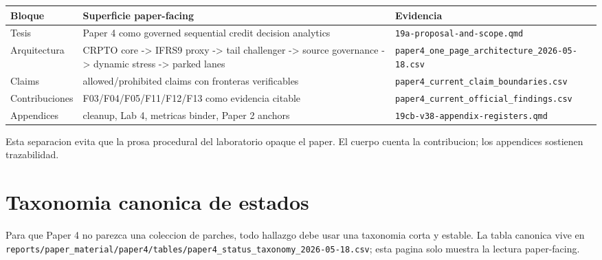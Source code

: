 \documentclass[
  spanish,
  11pt,
  letterpaper,
]{scrbook}
\newcounter{none} %
\theoremstyle{plain}
\theoremstyle{remark}
\begin{document}
{\def\LTcaptype{none} %
\begin{longtable}[]{@{}
  >{\raggedright\arraybackslash}p{}
  >{\raggedright\arraybackslash}p{}
  >{\raggedright\arraybackslash}p{}@{}}
\toprule\noalign{}
\begin{minipage}[b]{\linewidth}\raggedright
Bloque
\end{minipage} & \begin{minipage}[b]{\linewidth}\raggedright
Superficie paper-facing
\end{minipage} & \begin{minipage}[b]{\linewidth}\raggedright
Evidencia
\end{minipage} \\
\midrule\noalign{}
\endhead
\bottomrule\noalign{}
\endlastfoot
Tesis & Paper 4 como governed sequential credit decision analytics &
\texttt{19a-proposal-and-scope.qmd} \\
Arquitectura & CRPTO core -\textgreater{} IFRS9 proxy -\textgreater{}
tail challenger -\textgreater{} source governance -\textgreater{}
dynamic stress -\textgreater{} parked lanes &
\texttt{paper4\_one\_page\_architecture\_2026-05-18.csv} \\
Claims & allowed/prohibited claims con fronteras verificables &
\texttt{paper4\_current\_claim\_boundaries.csv} \\
Contribuciones & F03/F04/F05/F11/F12/F13 como evidencia citable &
\texttt{paper4\_current\_official\_findings.csv} \\
Appendices & cleanup, Lab 4, metricas binder, Paper 2 anchors &
\texttt{19cb-v38-appendix-registers.qmd} \\
\end{longtable}
}

Esta separacion evita que la prosa procedural del laboratorio opaque el
paper. El cuerpo cuenta la contribucion; los appendices sostienen
trazabilidad.

\section{Taxonomia canonica de
estados}\label{taxonomia-canonica-de-estados}

Para que Paper 4 no parezca una coleccion de parches, todo hallazgo debe
usar una taxonomia corta y estable. La tabla canonica vive en
\texttt{reports/paper\_material/paper4/tables/paper4\_status\_taxonomy\_2026-05-18.csv};
esta pagina solo muestra la lectura paper-facing.
\end{document}
